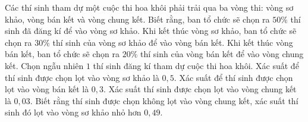 \begin{ex}
Các thí sinh tham dự một cuộc thi hoa khôi phải trải qua ba vòng thi: vòng sơ khảo, vòng bán kết và vòng chung kết. Biết rằng, ban tổ chức sẽ chọn ra $50\%$ thí sinh đã đăng kí để vào vòng sơ khảo. Khi kết thúc vòng sơ khảo, ban tổ chức sẽ chọn ra $30\%$ thí sinh của vòng sơ khảo để vào vòng bán kết. Khi kết thúc vòng bán kết, ban tổ chức sẽ chọn ra $20\%$ thí sinh của vòng bán kết để vào vòng chung kết. Chọn ngẫu nhiên $1$ thí sinh đăng kí tham dự cuộc thi hoa khôi.
\choiceTF
{\True Xác suất để thí sinh được chọn lọt vào vòng sơ khảo là $0{,}5$.}
{Xác suất để thí sinh được chọn lọt vào vòng bán kết là $0{,}3$.}
{\True Xác suất thí sinh được chọn lọt vào vòng chung kết là $0{,}03$.}
{\True Biết rằng thí sinh được chọn không lọt vào vòng chung kết, xác suất thí sinh đó lọt vào vòng sơ khảo nhỏ hơn $0{,}49$.}
\end{ex}
